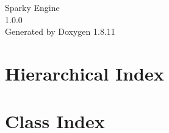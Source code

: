 \documentclass[twoside]{book}
\newcommand{\+}{\discretionary{\mbox{\scriptsize$\hookleftarrow$}}{}{}}
\newcommand{\clearemptydoublepage}{%
  \newpage{\pagestyle{empty}\cleardoublepage}%
}
\begin{document}
\hypersetup{pageanchor=false,
             bookmarksnumbered=true,
             pdfencoding=unicode
            }
\begin{titlepage}
\vspace*{7cm}
\begin{center}%
{\Large Sparky Engine \\[1ex]\large 1.\+0.\+0 }\\
\vspace*{1cm}
{\large Generated by Doxygen 1.8.11}\\
\end{center}
\end{titlepage}
\clearemptydoublepage
\tableofcontents
\clearemptydoublepage
{}
\hypersetup{pageanchor=true}

\chapter{Hierarchical Index}

\chapter{Class Index}

\end{document}
